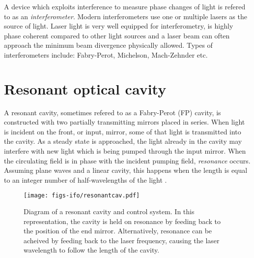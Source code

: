 A device which exploits interference to measure phase changes of light is refered to as an \emph{interferometer}. %
Modern interferometers use one or multiple lasers as the source of light. %
Laser light is very well equipped for interferometry, is highly phase coherent compared to other light sources and a laser beam can often approach the minimum beam divergence physically allowed. %
Types of interferometers include: Fabry-Perot, Michelson, Mach-Zehnder etc.

\section{Resonant optical cavity}
A resonant cavity, sometimes refered to as a Fabry-Perot (FP) cavity, is constructed with two partially transmitting mirrors placed in series. %
When light is incident on the front, or input, mirror, some of that light is transmitted into the cavity. %
As a steady state is approached, the light already in the cavity may interfere with new light which is being pumped through the input mirror. %
When the circulating field is in phase with the incident pumping field, \emph{resonance} occurs. %
Assuming plane waves and a linear cavity, this happens when the length is equal to an integer number of half-wavelengths of the light \cite{Siegman}.

\begin{figure}
  \begin{center}
  \leavevmode
  \texttt{[image: figs-ifo/resonantcav.pdf]}
  \end{center}
  \caption[Diagram of a resonant cavity and control system]{Diagram of a resonant cavity and control system. In this representation, the cavity is held on resonance by feeding back to the position of the end mirror. Alternatively, resonance can be acheived by feeding back to the laser frequency, causing the laser wavelength to follow the length of the cavity.}
  \label{fig:resonantcav}
\end{figure}

